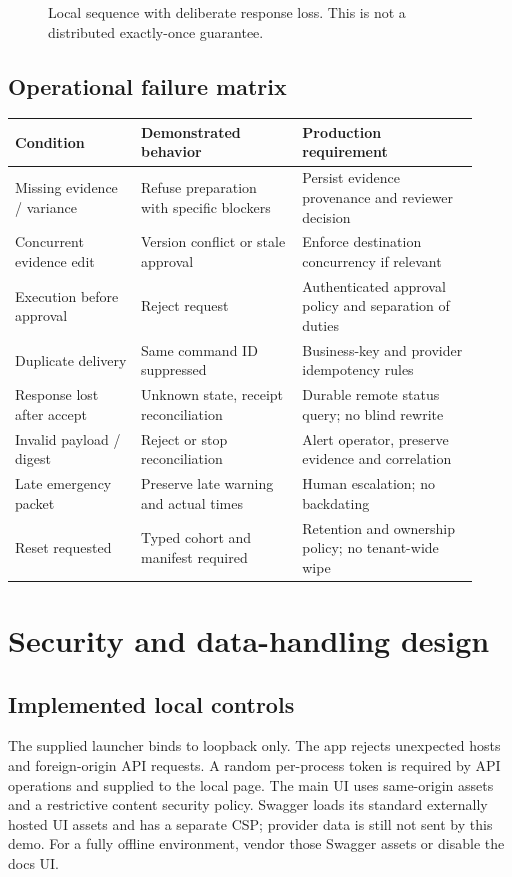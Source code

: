 \documentclass[11pt,letterpaper]{article}
\begin{document}
\begin{figure}[htbp]
{}
\caption{Local sequence with deliberate response loss. This is not a distributed exactly-once guarantee.}
\end{figure}

\subsection{Operational failure matrix}
\begin{longtable}{p{0.25\linewidth}p{0.32\linewidth}p{0.35\linewidth}}
\toprule Condition & Demonstrated behavior & Production requirement\\\midrule
Missing evidence / variance & Refuse preparation with specific blockers & Persist evidence provenance and reviewer decision\\
Concurrent evidence edit & Version conflict or stale approval & Enforce destination concurrency if relevant\\
Execution before approval & Reject request & Authenticated approval policy and separation of duties\\
Duplicate delivery & Same command ID suppressed & Business-key and provider idempotency rules\\
Response lost after accept & Unknown state, receipt reconciliation & Durable remote status query; no blind rewrite\\
Invalid payload / digest & Reject or stop reconciliation & Alert operator, preserve evidence and correlation\\
Late emergency packet & Preserve late warning and actual times & Human escalation; no backdating\\
Reset requested & Typed cohort and manifest required & Retention and ownership policy; no tenant-wide wipe\\
\bottomrule
\end{longtable}

\section{Security and data-handling design}
\subsection{Implemented local controls}
The supplied launcher binds to loopback only. The app rejects unexpected hosts and foreign-origin API requests. A random per-process token is required by API operations and supplied to the local page. The main UI uses same-origin assets and a restrictive content security policy. Swagger loads its standard externally hosted UI assets and has a separate CSP; provider data is still not sent by this demo. For a fully offline environment, vendor those Swagger assets or disable the docs UI.
\end{document}
